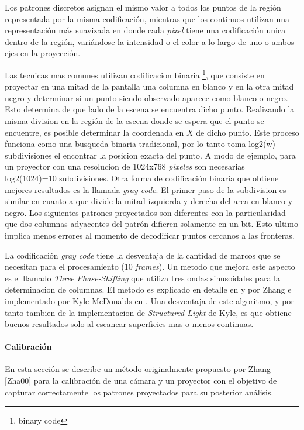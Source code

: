 Los patrones discretos asignan el mismo valor a todos los puntos de la región representada por la misma codificación, mientras que los continuos utilizan una representación más suavizada en donde cada \emph{pixel} tiene una codificación unica dentro de la región, variándose la intensidad o el color a lo largo de uno o ambos ejes en la proyección.

Las tecnicas mas comunes utilizan codificacion binaria \footnote{binary code}, que consiste en proyectar en una mitad de la pantalla una columna en blanco y en la otra mitad negro y determinar si un punto siendo observado aparece como blanco o negro. Esto determina de que lado de la escena se encuentra dicho punto. Realizando la misma division en la región de la escena donde se espera que el punto se encuentre, es posible determinar la coordenada en $X$ de dicho punto. Este proceso funciona como una busqueda binaria tradicional, por lo tanto toma log2(w) subdivisiones el encontrar la posicion exacta del punto. A modo de ejemplo, para un proyector con una resolucion de 1024x768 \emph{pixeles} son necesarias log2(1024)=10 subdivisiones. Otra forma de codificación binaria que obtiene mejores resultados es la llamada \emph{gray code}. El primer paso de la subdivision es similar en cuanto a que divide la mitad izquierda y derecha del area en blanco y negro. Los siguientes patrones proyectados son diferentes con la particularidad que dos columnas adyacentes del patrón difieren solamente en un bit. Esto ultimo implica menos errores al momento de decodificar puntos cercanos a las fronteras.  

La codificación \emph{gray code} tiene la desventaja de la cantidad de marcos que se necesitan para el procesamiento (10 \emph{frames}). Un metodo que mejora este aspecto es el llamado \emph{Three Phase-Shifting} que utiliza tres ondas sinusoidales para la determinacion de columnas. El metodo es explicado en detalle en \cite{3DShapeMeasurement} y \cite{SLThreeStepPhaseShift} por Zhang e implementado por Kyle McDonalds en \cite{KyleMcDonald}. Una desventaja de este algoritmo, y por tanto tambien de la implementacion de \emph{Structured Light} de Kyle, es que obtiene buenos resultados solo al escanear superficies mas o menos continuas.

\paragraph{Calibración}

En esta sección se describe un método originalmente propuesto por Zhang [Zha00] para la calibración de una cámara y un proyector con el objetivo de capturar correctamente los patrones proyectados para su posterior análisis. 

